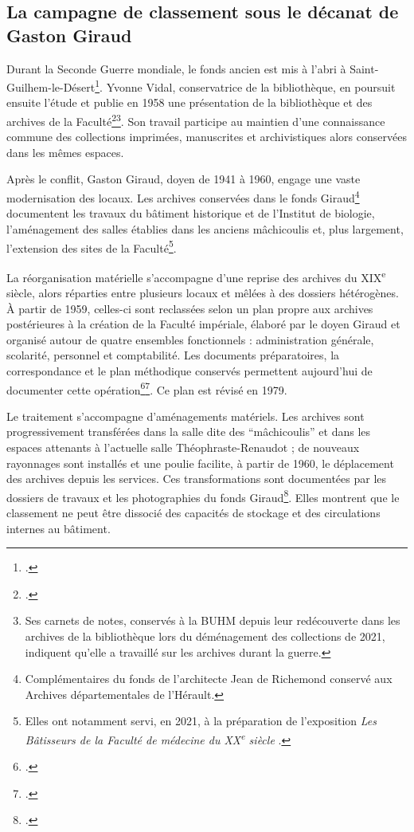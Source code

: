 \subsection{La campagne de classement sous le décanat de Gaston Giraud}

Durant la Seconde Guerre mondiale, le fonds ancien est mis à l'abri à Saint-Guilhem-le-Désert\footcite{AHFM1MED211}. Yvonne Vidal, conservatrice de la bibliothèque, en poursuit ensuite l'étude et publie en 1958 une présentation de la bibliothèque et des archives de la Faculté\footcite{Vidal1958BibliothequeArchives}\footnote{Ses carnets de notes, conservés à la BUHM depuis leur redécouverte dans les archives de la bibliothèque lors du déménagement des collections de 2021, indiquent qu'elle a travaillé sur les archives durant la guerre.}. Son travail participe au maintien d'une connaissance commune des collections imprimées, manuscrites et archivistiques alors conservées dans les mêmes espaces.

Après le conflit, Gaston Giraud, doyen de 1941 à 1960, engage une vaste modernisation des locaux. Les archives conservées dans le fonds Giraud\footnote{Complémentaires du fonds de l'architecte Jean de Richemond conservé aux Archives départementales de l'Hérault.} documentent les travaux du bâtiment historique et de l'Institut de biologie, l'aménagement des salles établies dans les anciens mâchicoulis et, plus largement, l'extension des sites de la Faculté\footnote{Elles ont notamment servi, en 2021, à la préparation de l'exposition \emph{Les Bâtisseurs de la Faculté de médecine du XX\textsuperscript{e} siècle} \parencite{BatisseursFaculte2021}.}.

La réorganisation matérielle s'accompagne d'une reprise des archives du XIX\textsuperscript{e} siècle, alors réparties entre plusieurs locaux et mêlées à des dossiers hétérogènes. À partir de 1959, celles-ci sont reclassées selon un plan propre aux archives postérieures à la création de la Faculté impériale, élaboré par le doyen Giraud et organisé autour de quatre ensembles fonctionnels : administration générale, scolarité, personnel et comptabilité. Les documents préparatoires, la correspondance et le plan méthodique conservés permettent aujourd'hui de documenter cette opération\footcite{AHFM1MED208}\footcite{Perroud2009FondsModerne}. Ce plan est révisé en 1979.

Le traitement s'accompagne d'aménagements matériels. Les archives sont progressivement transférées dans la salle dite des \enquote{mâchicoulis} et dans les espaces attenants à l'actuelle salle Théophraste-Renaudot ; de nouveaux rayonnages sont installés et une poulie facilite, à partir de 1960, le déplacement des archives depuis les services. Ces transformations sont documentées par les dossiers de travaux et les photographies du fonds Giraud\footcite{BatisseursFaculte2021}. Elles montrent que le classement ne peut être dissocié des capacités de stockage et des circulations internes au bâtiment.

